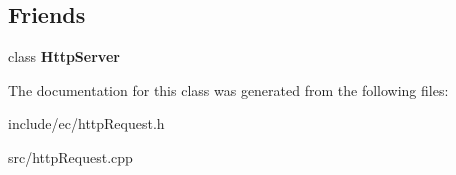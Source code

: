 \subsection*{Friends}
\begin{DoxyCompactItemize}
\item 
\hypertarget{classec_1_1HttpRequest_a7ef68af4cc3915e661d6bb0255d265d2}{class {\bfseries Http\-Server}}\label{classec_1_1HttpRequest_a7ef68af4cc3915e661d6bb0255d265d2}

\end{DoxyCompactItemize}


The documentation for this class was generated from the following files\-:\begin{DoxyCompactItemize}
\item 
include/ec/http\-Request.\-h\item 
src/http\-Request.\-cpp\end{DoxyCompactItemize}
